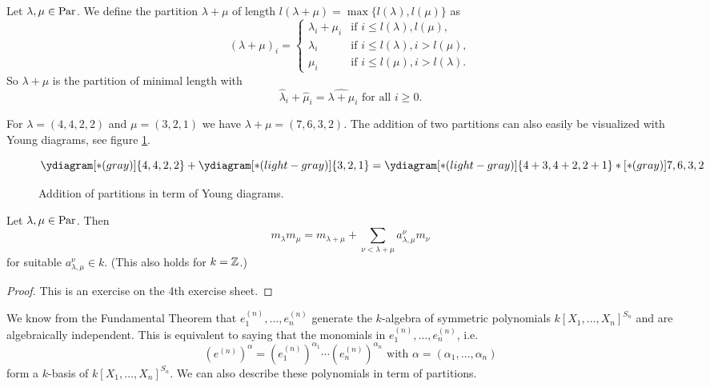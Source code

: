 \begin{defi}
 Let $\lambda, \mu \in \operatorname{Par}$. We define the partition $\lambda+\mu$ of length $l(\lambda+\mu) = \max\{ l(\lambda), l(\mu) \}$ as
 \[
  (\lambda+\mu)_i =
  \begin{cases}
   \lambda_i + \mu_i & \text{if } i \leq l(\lambda),l(\mu), \\
   \lambda_i         & \text{if } i \leq l(\lambda), i > l(\mu), \\
   \mu_i             & \text{if } i \leq l(\mu), i > l(\lambda).
  \end{cases}
 \]
 So $\lambda+\mu$ is the partition of minimal length with
 \[
  \hat{\lambda}_i + \hat{\mu}_i = \widehat{\lambda+\mu}_i \text{ for all } i \geq 0.
 \]
\end{defi}


\begin{expl}
 For $\lambda = (4,4,2,2)$ and $\mu = (3,2,1)$ we have $\lambda+\mu = (7,6,3,2)$. The addition of two partitions can also easily be visualized with Young diagrams, see figure \ref{fig: addition partition young diagrams}.
 \begin{figure}\centering
  \[
   \ydiagram[*(gray)]{4,4,2,2} + \ydiagram[*(light-gray)]{3,2,1}
   = \ydiagram[*(light-gray)] {4+3,4+2,2+1} *[*(gray)]{7,6,3,2}
  \]
  \caption{Addition of partitions in term of Young diagrams.}
  \label{fig: addition partition young diagrams}
 \end{figure}
\end{expl}


\begin{lem}
 Let $\lambda, \mu \in \operatorname{Par}$. Then
 \[
  m_{\lambda} m_{\mu} = m_{\lambda + \mu} + \sum_{\nu < \lambda + \mu} a^\nu_{\lambda,\mu} m_\nu
 \]
 for suitable $a^\nu_{\lambda,\mu} \in k$. (This also holds for $k = \mathbb{Z}$.)
\end{lem}
\begin{proof}
 This is an exercise on the 4th exercise sheet.
\end{proof}


We know from the Fundamental Theorem that $e^{(n)}_1, \dotsc, e^{(n)}_n$ generate the $k$-algebra of symmetric polynomials $k[X_1, \dotsc, X_n]^{S_n}$ and are algebraically independent. This is equivalent to saying that the monomials in $e^{(n)}_1, \dotsc, e^{(n)}_n$, i.e.
\[
 \left( e^{(n)} \right)^\alpha = \left(e^{(n)}_1\right)^{\alpha_1} \dotsm \left(e^{(n)}_n\right)^{\alpha_n} \text{ with } \alpha = (\alpha_1, \dotsc, \alpha_n)
\]
form a $k$-basis of $k[X_1, \dotsc, X_n]^{S_n}$. We can also describe these polynomials in term of partitions.


